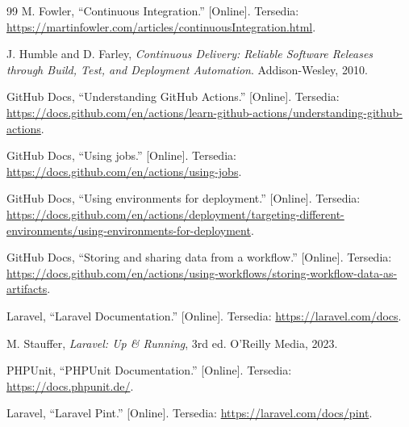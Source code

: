 \documentclass[a4paper,oneside,12pt]{report}
\renewcommand{\bibname}{Daftar Pustaka}
\begin{document}
\clearpage
{}
\renewcommand{\bibname}{Daftar Pustaka}
\begin{thebibliography}{99}
     M. Fowler, ``Continuous Integration.'' [Online]. Tersedia: \url{https://martinfowler.com/articles/continuousIntegration.html}.

     J. Humble and D. Farley, \textit{Continuous Delivery: Reliable Software Releases through Build, Test, and Deployment Automation}. Addison-Wesley, 2010.

     GitHub Docs, ``Understanding GitHub Actions.'' [Online]. Tersedia: \url{https://docs.github.com/en/actions/learn-github-actions/understanding-github-actions}.

     GitHub Docs, ``Using jobs.'' [Online]. Tersedia: \url{https://docs.github.com/en/actions/using-jobs}.

     GitHub Docs, ``Using environments for deployment.'' [Online]. Tersedia: \url{https://docs.github.com/en/actions/deployment/targeting-different-environments/using-environments-for-deployment}.

     GitHub Docs, ``Storing and sharing data from a workflow.'' [Online]. Tersedia: \url{https://docs.github.com/en/actions/using-workflows/storing-workflow-data-as-artifacts}.

     Laravel, ``Laravel Documentation.'' [Online]. Tersedia: \url{https://laravel.com/docs}.

     M. Stauffer, \textit{Laravel: Up \& Running}, 3rd ed. O'Reilly Media, 2023.

     PHPUnit, ``PHPUnit Documentation.'' [Online]. Tersedia: \url{https://docs.phpunit.de/}.

     Laravel, ``Laravel Pint.'' [Online]. Tersedia: \url{https://laravel.com/docs/pint}.

\end{thebibliography}
\end{document}

